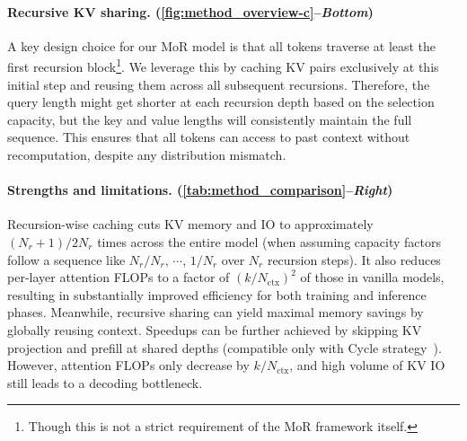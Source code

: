 \vspace{-12pt}
\paragraph{Recursive KV sharing. (\autoref{fig:method_overview-c}--\textit{Bottom})}

A key design choice for our MoR model is that all tokens traverse at least the first recursion block\footnote{Though this is not a strict requirement of the MoR framework itself.}. We leverage this by caching KV pairs exclusively at this initial step and reusing them across all subsequent recursions. Therefore, the query length might get shorter at each recursion depth based on the selection capacity, but the key and value lengths will consistently maintain the full sequence. This ensures that all tokens can access to past context without recomputation, despite any distribution mismatch.





\vspace{-12pt}
\paragraph{Strengths and limitations. (\autoref{tab:method_comparison}--\textit{Right})}

Recursion-wise caching cuts KV memory and IO to approximately $(N_r + 1)/2N_r$ times across the entire model (when assuming capacity factors follow a sequence like $N_r / N_r$, $\cdots$, $1 / N_r$ over $N_r$ recursion steps). It also reduces per-layer attention FLOPs to a factor of $(k / N_{\text{ctx}})^2$ of those in vanilla models, resulting in substantially improved efficiency for both training and inference phases.
Meanwhile, recursive sharing can yield maximal memory savings by globally reusing context. Speedups can be further achieved by skipping KV projection and prefill at shared depths (compatible only with Cycle strategy~\citep{sun2024you}). However, attention FLOPs only decrease by $k / N_{\text{ctx}}$, and high volume of KV IO still leads to a decoding bottleneck.


